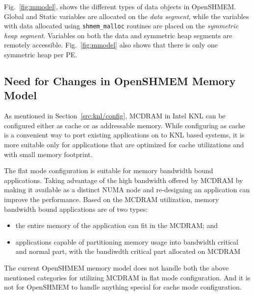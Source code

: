 Fig.~\ref{fig:mmodel}, shows the different types of data objects in
OpenSHMEM. Global and Static variables are allocated on the
\emph{data segment}, while the variables with data allocated using
\texttt{shmem\_malloc} routines are placed on the \emph{symmetric heap
segment}. Variables on both the data and symmetric heap segments are
remotely accessible. Fig.~\ref{fig:mmodel} also shows that there is only
one symmetric heap per PE. %

\subsection{Need for Changes in OpenSHMEM Memory Model}
\label{src:mmodel/drelated}
As mentioned in Section~\ref{src:knl/config}, MCDRAM in Intel KNL can be
configured either as cache or as addressable memory. While configuring as
cache is a convenient way to port existing applications on to KNL based
systems, it is more suitable only for applications that are optimized for
cache utilizations and with small memory footprint.

The flat mode configuration is suitable for memory bandwidth bound
applications. Taking advantage of the high bandwidth offered by MCDRAM by
making it available as a distinct NUMA node and re-designing an application
can improve the performance. Based on the MCDRAM utilization, memory
bandwidth bound applications are of two types:
\begin{itemize}
    \item the entire memory of the application can fit in the MCDRAM; and
    \item applications capable of partitioning memory usage into
    bandwidth critical and normal part, with the bandiwdth critical part
    allocated on MCDRAM
\end{itemize}
The current OpenSHMEM memory model does not handle both the above mentioned
categories for utilizing MCDRAM in flat mode configuration. And it is not
for OpenSHMEM to handle anything special for cache mode configuration.
